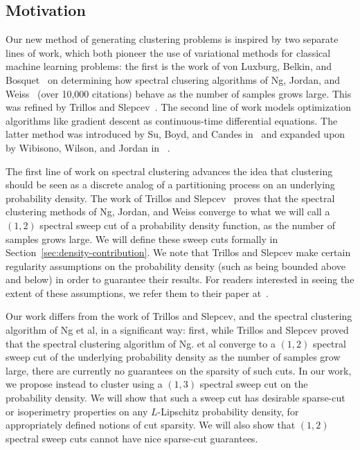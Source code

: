 \subsection{Motivation}

Our new method of generating clustering problems is inspired by two
separate lines of work, which both pioneer the use of variational
methods for
classical machine learning problems: the first is the work of von
Luxburg, Belkin, and Bosquet~\cite{von2008consistency} on determining how 
spectral clusering algorithms of Ng, Jordan, and
Weiss~\cite{NgSpectral01} (over 10,000 citations) behave as the number
of samples grows large. This was refined by Trillos and
Slepcev~\cite{TrillosRate15, TrillosVariational15}.
The second line of work models optimization algorithms like gradient descent
as continuous-time differential equations. The latter method was introduced
by Su, Boyd, and Candes in~\cite{SuNesterov14} and expanded upon by
Wibisono, Wilson, and Jordan in ~\cite{WibisonoGradient16}.


The first line of work on spectral clustering advances the idea that
clustering should be seen as a discrete analog of a partitioning process
on an underlying probability density. The work of Trillos and
Slepcev~\cite{TrillosVariational15} proves that the
spectral clustering methods of Ng, Jordan, and Weiss converge to what we
will call a $(1,2)$ spectral sweep cut of a probability density
function, as the number of samples grows large. We will define these
sweep cuts formally in Section~\ref{sec:density-contribution}. We note
that Trillos and Slepcev
make certain regularity assumptions on the probability density (such as
being bounded above and below) in order to guarantee their results. For
readers interested in seeing the extent of these assumptions, we refer
them to their paper at~\cite{TrillosVariational15}.

Our work differs from the work of Trillos and Slepcev, and the spectral
clustering algorithm of Ng et al, in a significant way: first, while
Trillos and Slepcev proved that the
spectral clustering algorithm of Ng. et al converge to a $(1,2)$ spectral
sweep cut of the underlying probability density as the number of samples
grow large, there are currently no guarantees on the sparsity of such
cuts.
In our work, we propose instead to cluster
using a $(1,3)$ spectral sweep cut on the probability density. We will show that such a sweep cut has
desirable sparse-cut or isoperimetry properties on any $L$-Lipschitz
probability density, for appropriately
defined notions of cut sparsity. We will also show that $(1,2)$ spectral
sweep cuts cannot have nice sparse-cut guarantees.

